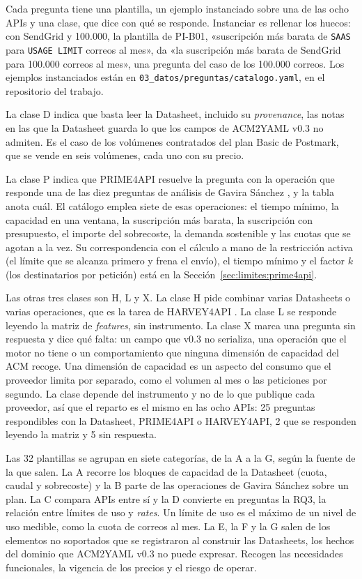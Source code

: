 Cada pregunta tiene una plantilla, un ejemplo instanciado sobre una de las ocho APIs y una clase, que dice con qué se responde.
Instanciar es rellenar los huecos: con SendGrid y 100.000, la plantilla de PI-B01, «suscripción más barata de \texttt{SAAS} para \texttt{USAGE LIMIT} correos al mes», da «la suscripción más barata de SendGrid para 100.000 correos al mes», una pregunta del caso de los 100.000 correos.
Los ejemplos instanciados están en \texttt{03\_datos/preguntas/catalogo.yaml}, en el repositorio del trabajo.

La clase D indica que basta leer la Datasheet, incluido su \textit{provenance}, las notas en las que la Datasheet guarda lo que los campos de ACM2YAML v0.3 no admiten.
Es el caso de los volúmenes contratados del plan Basic de Postmark, que se vende en seis volúmenes, cada uno con su precio.

La clase P indica que PRIME4API resuelve la pregunta con la operación que responde una de las diez preguntas de análisis de Gavira Sánchez \citep{gavira2026tfm}, y la tabla anota cuál.
El catálogo emplea siete de esas operaciones: el tiempo mínimo, la capacidad en una ventana, la suscripción más barata, la suscripción con presupuesto, el importe del sobrecoste, la demanda sostenible y las cuotas que se agotan a la vez.
Su correspondencia con el cálculo a mano de la restricción activa (el límite que se alcanza primero y frena el envío), el tiempo mínimo y el factor $k$ (los destinatarios por petición) está en la Sección~\ref{sec:limites:prime4api}.

Las otras tres clases son H, L y X.
La clase H pide combinar varias Datasheets o varias operaciones, que es la tarea de HARVEY4API \citep{ruizlopez2026tfm}.
La clase L se responde leyendo la matriz de \textit{features}, sin instrumento.
La clase X marca una pregunta sin respuesta y dice qué falta: un campo que v0.3 no serializa, una operación que el motor no tiene o un comportamiento que ninguna dimensión de capacidad del ACM recoge.
Una dimensión de capacidad es un aspecto del consumo que el proveedor limita por separado, como el volumen al mes o las peticiones por segundo.
La clase depende del instrumento y no de lo que publique cada proveedor, así que el reparto es el mismo en las ocho APIs: 25 preguntas respondibles con la Datasheet, PRIME4API o HARVEY4API, 2 que se responden leyendo la matriz y 5 sin respuesta.

Las 32 plantillas se agrupan en siete categorías, de la A a la G, según la fuente de la que salen.
La A recorre los bloques de capacidad de la Datasheet (cuota, caudal y sobrecoste) y la B parte de las operaciones de Gavira Sánchez sobre un plan.
La C compara APIs entre sí y la D convierte en preguntas la RQ3, la relación entre límites de uso y \textit{rates}.
Un límite de uso es el máximo de un nivel de uso medible, como la cuota de correos al mes.
La E, la F y la G salen de los elementos no soportados que se registraron al construir las Datasheets, los hechos del dominio que ACM2YAML v0.3 no puede expresar.
Recogen las necesidades funcionales, la vigencia de los precios y el riesgo de operar.

